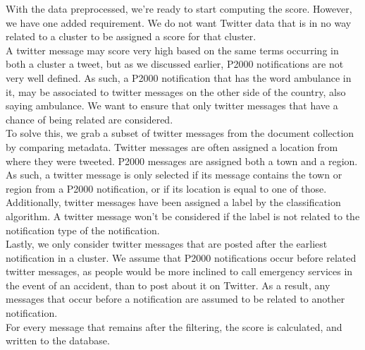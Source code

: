 With the data preprocessed, we're ready to start computing the score.
However, we have one added requirement.
We do not want Twitter data that is in no way related to a cluster to be assigned a score for that cluster. \\
A twitter message may score very high based on the same terms occurring in both a cluster a tweet, but as we discussed earlier, P2000 notifications are not very well defined.
As such, a P2000 notification that has the word ambulance in it, may be associated to twitter messages on the other side of the country, also saying ambulance.
We want to ensure that only twitter messages that have a chance of being related are considered. \\

To solve this, we grab a subset of twitter messages from the document collection by comparing metadata.
Twitter messages are often assigned a location from where they were tweeted.
P2000 messages are assigned both a town and a region.
As such, a twitter message is only selected if its message contains the town or region from a P2000 notification, or if its location is equal to one of those. \\
Additionally, twitter messages have been assigned a label by the classification algorithm.
A twitter message won't be considered if the label is not related to the notification type of the notification. \\
Lastly, we only consider twitter messages that are posted after the earliest notification in a cluster.
We assume that P2000 notifications occur before related twitter messages, as people would be more inclined to call emergency services in the event of an accident, than to post about it on Twitter.
As a result, any messages that occur before a notification are assumed to be related to another notification. \\

For every message that remains after the filtering, the score is calculated, and written to the database.


